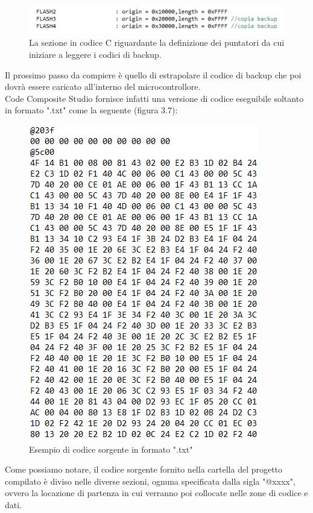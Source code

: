 \documentclass[LaM,binding=0.6cm]{../sapthesis}
\begin{document}
\begin{figure}[htbp]
\centerline{\includegraphics[scale=.67]{examples/PuntatoriDiStartBootloader.PNG}}
\caption{La sezione in codice C riguardante la definizione dei puntatori da cui iniziare a leggere i codici di backup.}
\label{fig}
\end{figure}

Il prossimo passo da compiere è quello di estrapolare il codice di backup che poi dovrà essere caricato all'interno del microcontrollore. \\
Code Composite Studio fornisce infatti una versione di codice eseguibile soltanto in formato ".txt" come la seguente (figura 3.7):
\begin{figure}[htbp]
\centerline{\includegraphics[scale=.67]{examples/TxtCodeBootloader.PNG}}
\caption{Esempio di codice sorgente in formato ".txt"}
\label{fig}
\end{figure}

Come possiamo notare, il codice sorgente fornito nella cartella del progetto compilato è diviso nelle diverse sezioni, ognuna specificata dalla sigla "@xxxx", ovvero la locazione di partenza in cui verranno poi collocate nelle zone di codice e dati. 
\end{document}
